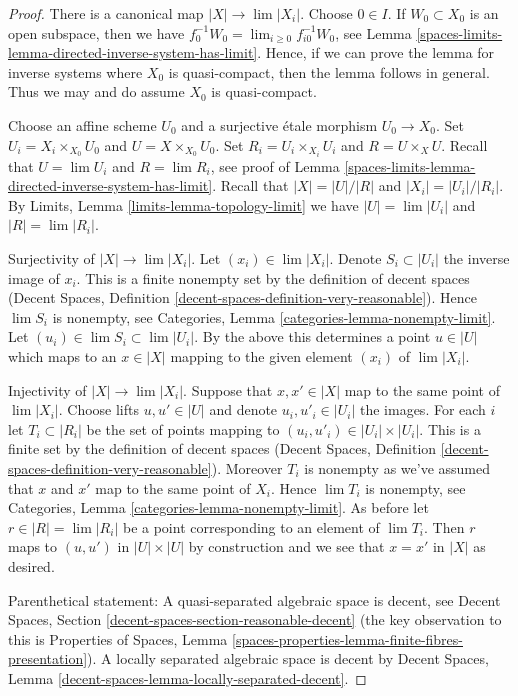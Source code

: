 \begin{proof}
There is a canonical map $|X| \to \lim |X_i|$. Choose $0 \in I$.
If $W_0 \subset X_0$ is an open subspace, then we have
$f_0^{-1}W_0 = \lim_{i \geq 0} f_{i0}^{-1}W_0$, see
Lemma \ref{spaces-limits-lemma-directed-inverse-system-has-limit}.
Hence, if we can prove the lemma for inverse systems where $X_0$
is quasi-compact, then the lemma follows in general. Thus we may and do
assume $X_0$ is quasi-compact.

\medskip\noindent
Choose an affine scheme $U_0$ and a surjective \'etale morphism $U_0 \to X_0$.
Set $U_i = X_i \times_{X_0} U_0$ and $U = X \times_{X_0} U_0$.
Set $R_i = U_i \times_{X_i} U_i$ and $R = U \times_X U$.
Recall that $U = \lim U_i$ and $R = \lim R_i$, see proof of
Lemma \ref{spaces-limits-lemma-directed-inverse-system-has-limit}.
Recall that $|X| = |U|/|R|$ and $|X_i| = |U_i|/|R_i|$. By
Limits, Lemma \ref{limits-lemma-topology-limit} we have
$|U| = \lim |U_i|$ and $|R| = \lim |R_i|$.

\medskip\noindent
Surjectivity of $|X| \to \lim |X_i|$. Let $(x_i) \in \lim |X_i|$. Denote
$S_i \subset |U_i|$ the inverse image of $x_i$. This is a finite nonempty
set by the definition of decent spaces
(Decent Spaces, Definition \ref{decent-spaces-definition-very-reasonable}).
Hence $\lim S_i$ is nonempty, see
Categories, Lemma \ref{categories-lemma-nonempty-limit}.
Let $(u_i) \in \lim S_i \subset \lim |U_i|$. By the above this determines
a point $u \in |U|$ which maps to an $x \in |X|$ mapping to the given
element $(x_i)$ of $\lim |X_i|$.

\medskip\noindent
Injectivity of $|X| \to \lim |X_i|$. Suppose that $x, x' \in |X|$
map to the same point of $\lim |X_i|$. Choose lifts $u, u' \in |U|$
and denote $u_i, u'_i \in |U_i|$ the images.
For each $i$ let $T_i \subset |R_i|$ be the set of points mapping
to $(u_i, u'_i) \in |U_i| \times |U_i|$. This is a finite
set by the definition of decent spaces
(Decent Spaces, Definition \ref{decent-spaces-definition-very-reasonable}).
Moreover $T_i$ is nonempty as we've assumed that $x$ and $x'$ map to the
same point of $X_i$. Hence $\lim T_i$ is nonempty, see
Categories, Lemma \ref{categories-lemma-nonempty-limit}.
As before let $r \in |R| = \lim |R_i|$ be a point corresponding to an
element of $\lim T_i$. Then $r$ maps to $(u, u')$ in $|U| \times |U|$
by construction and we see that $x = x'$ in $|X|$ as desired.

\medskip\noindent
Parenthetical statement: A quasi-separated algebraic space is decent, see
Decent Spaces, Section \ref{decent-spaces-section-reasonable-decent}
(the key observation to this is Properties of Spaces, Lemma
\ref{spaces-properties-lemma-finite-fibres-presentation}).
A locally separated algebraic space is decent by
Decent Spaces, Lemma \ref{decent-spaces-lemma-locally-separated-decent}.
\end{proof}

